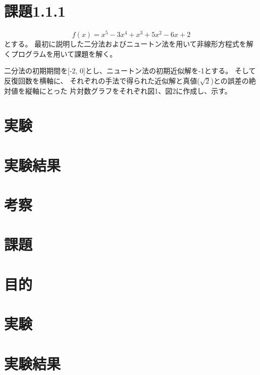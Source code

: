 \documentclass[uplatex, 11pt,a4j, titlepage]{jsarticle}
\begin{document}
\section{課題1.1.1}
\begin{equation}
    f(x) = x^5 - 3 x^4 + x^3 + 5 x^2 - 6x + 2 
\end{equation}
とする。
最初に説明した二分法およびニュートン法を用いて非線形方程式を解くプログラムを用いて課題を解く。


二分法の初期期間を[-2, 0]とし、ニュートン法の初期近似解を-1とする。
そして反復回数を横軸に、
それぞれの手法で得られた近似解と真値($\sqrt{2}$)との誤差の絶対値を縦軸にとった
片対数グラフをそれぞれ図1、図2に作成し、示す。



\section{実験}
\section{実験結果}
\section{考察}
\section{課題}


\newpage
\resetcounters


\subtitle{2020/10/*}

\section{目的}
\section{実験}
\section{実験結果}
\end{document}
